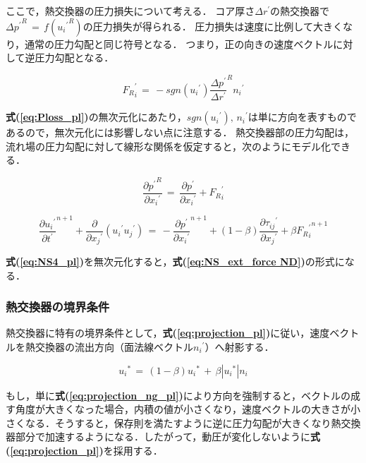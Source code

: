 ここで，熱交換器の圧力損失について考える．
コア厚さ$\Delta r^{\prime}$の熱交換器で${\Delta p^{\prime}}^{R}\, =\, f({{u_{i}}^{\prime}}^{R})$の圧力損失が得られる．
圧力損失は速度に比例して大きくなり，通常の圧力勾配と同じ符号となる．
つまり，正の向きの速度ベクトルに対して逆圧力勾配となる．

\begin{equation}
{F_{R}}_{i}^{\prime} \, =\,
-{sgn} \left({ {u_{i}}^{\prime} }\right) {\frac{\Delta{p}^{\prime}}{\Delta{r}^{\prime}}}^{R} {n_{i}}^{\prime}
\label{eq:Ploss_pl}
\end{equation}


\textbf{式(\ref{eq:Ploss_pl})}の無次元化にあたり，$sgn{({u_{i}}^{\prime})}, \, {n_{i}}^{\prime}$は単に方向を表すものであるので，無次元化には影響しない点に注意する．
熱交換器部の圧力勾配は，流れ場の圧力勾配に対して線形な関係を仮定すると，次のようにモデル化できる．

\begin{equation}
\frac{{\partial{p}^{\prime}}^{R}}{\partial{x_{i}}^{\prime}}
\, =\,
\frac{\partial{p}^{\prime}}{\partial{x_{i}}^{\prime}} + {F_{R}}_{i}^{\prime}
\label{eq:Ploss2_pl}
\end{equation}

\begin{equation}
{\frac{\partial{u_{i}}^{\prime}}{\partial{t}^{\prime}}}^{n+1} + \frac{\partial}{\partial{x_{j}}^{\prime}} \left({ {u_{i}}^{\prime} {u_{j}}^{\prime} }\right)
\, =\,
- {\frac{\partial{p}^{\prime}}{\partial{x_{i}}^{\prime}}}^{n+1} + (1-\beta) \frac{\partial{\tau_{ij}}^{\prime}}{\partial{x_{j}}^{\prime}} + \beta {{F_{R}}_{i}^{\prime}}^{n+1}
\label{eq:NS4_pl}
\end{equation}

\textbf{式(\ref{eq:NS4_pl})}を無次元化すると，\textbf{式(\ref{eq:NS_ext_force ND})}の形式になる．

%
\subsubsection{熱交換器の境界条件}
熱交換器に特有の境界条件として，\textbf{式(\ref{eq:projection_pl})}に従い，速度ベクトルを熱交換器の流出方向（面法線ベクトル${n_{i}}^{\prime}$）へ射影する．

\begin{equation}
{u_{i}}^{*}
\, =\,
(1-\beta) {u_{i}}^{*} \,+\, \beta \left|{ {u_{i}}^{*} }\right| n_{i}
\label{eq:projection_pl}
\end{equation}

もし，単に\textbf{式(\ref{eq:projection_ng_pl})}により方向を強制すると，ベクトルの成す角度が大きくなった場合，内積の値が小さくなり，速度ベクトルの大きさが小さくなる．そうすると，保存則を満たすように逆に圧力勾配が大きくなり熱交換器部分で加速するようになる．したがって，動圧が変化しないように\textbf{式(\ref{eq:projection_pl})}を採用する．

